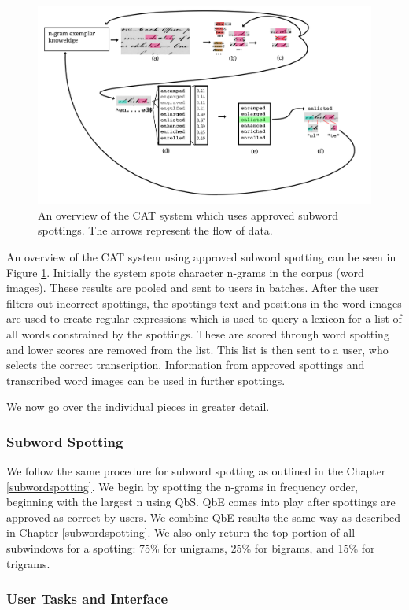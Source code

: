 \documentclass[ms,electronic,twosidetoc,letterpaper,chaptercenter,parttop,lol,lof,lot]{byumsphd}
\begin{document}
\begin{figure}
    \centering
    \includegraphics[width=.9\textwidth]{flow6}
    \caption{An overview of the CAT system which uses approved subword spottings. The arrows represent the flow of data.}
    \label{fig:flow}
\end{figure}
An overview of the CAT system using approved subword spotting can be seen in Figure \ref{fig:flow}. Initially the system spots character n-grams in the corpus (word images). These results are pooled and sent to users in batches. After the user filters out incorrect spottings, the spottings text and positions in the word images are used to create regular expressions which is used to query a lexicon for a list of all words constrained by the spottings. These are scored through word spotting and lower scores are removed from the list. This list is then sent to a user, who selects the correct transcription. Information from approved spottings and transcribed word images can be used in further spottings.

We now go over the individual pieces in greater detail.

\subsubsection{Subword Spotting}
We follow the same procedure for subword spotting as outlined in the Chapter \ref{subwordspotting}. We begin by spotting the n-grams in frequency order, beginning with the largest n using QbS. QbE comes into play after spottings are approved as correct by users. We combine QbE results the same way as described in Chapter \ref{subwordspotting}.
We also only return the top portion of all subwindows for a spotting: 75\% for unigrams, 25\% for bigrams, and 15\% for trigrams.

\subsubsection{User Tasks and Interface}
\end{document}
